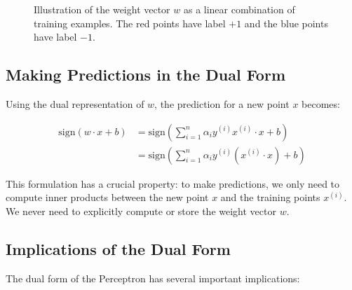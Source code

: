 \documentclass{article}
\begin{document}
\begin{figure}[h]
\centering
{}
\caption{Illustration of the weight vector $w$ as a linear combination of training examples. The red points have label $+1$ and the blue points have label $-1$.}
\end{figure}

\subsection{Making Predictions in the Dual Form}
Using the dual representation of $w$, the prediction for a new point $x$ becomes:

\begin{align}
\text{sign}(w \cdot x + b) &= \text{sign}\left(\sum_{i=1}^{n} \alpha_i y^{(i)} x^{(i)} \cdot x + b\right) \\
&= \text{sign}\left(\sum_{i=1}^{n} \alpha_i y^{(i)} (x^{(i)} \cdot x) + b\right)
\end{align}

This formulation has a crucial property: to make predictions, we only need to compute inner products between the new point $x$ and the training points $x^{(i)}$. We never need to explicitly compute or store the weight vector $w$.

\subsection{Implications of the Dual Form}
The dual form of the Perceptron has several important implications:
\end{document}
